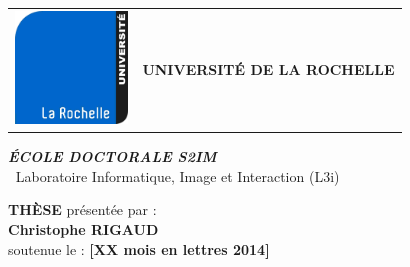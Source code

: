 \thispagestyle{empty}

\setmarginsrb{20mm}{0mm}{15mm}{15mm}{0mm}{0mm}{0mm}{0mm}


\begin{tabular}{ p{3cm} p{12cm}}
		\begin{minipage}{3cm}
			\includegraphics[width=3cm]{./images/UnivLaRochelle.png} 
		\end{minipage}
	&
		\begin{minipage}{12cm}
			\begin{center}
				\textbf{\LARGE\textbf{UNIVERSIT\'{E} DE LA ROCHELLE}}
			\end{center}
		\end{minipage}
\end{tabular}
	
\vspace{1.3cm}
	
\begin{minipage}{16cm}
	\begin{center}
	\LARGE \textit{\textbf{
		\'ECOLE DOCTORALE S2IM \\ \vspace{0.2cm}}}
		$\ $ Laboratoire Informatique, Image et Interaction (L3i)
	\end{center}
\end{minipage}
	
\vspace{1.3cm}
	
\begin{minipage}{16cm}
	\begin{center}
		\LARGE \textbf{TH\`ESE}
		\normalsize pr\'esent\'ee par : \\ \vspace{0.5cm}
		\LARGE \textbf{Christophe RIGAUD}\\ \vspace{0.5cm}
		\large soutenue le : \textbf{[XX mois en lettres 2014]}
	\end{center}
\end{minipage}
	
\vspace{0.2cm}
	
